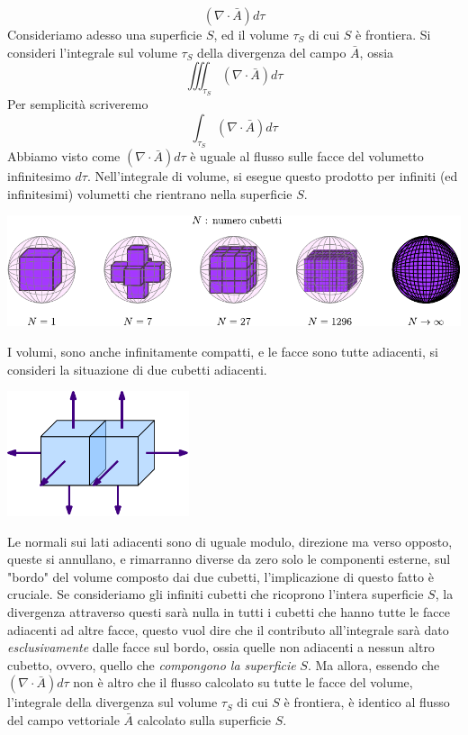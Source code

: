 \documentclass[10pt, letterpaper]{report}
\begin{document}
$$ (\nabla \cdot \bar A)d\tau$$
Consideriamo adesso una superficie $S$, ed il volume $\tau_S$ di cui $S$ è frontiera. Si consideri l'integrale sul volume $\tau_S$ della divergenza del campo $\bar A$, ossia 
$$ \iiint_{\tau_S}(\nabla \cdot \bar A)d\tau$$
Per semplicità scriveremo 
$$ \int_{\tau_S}(\nabla \cdot \bar A)d\tau$$
Abbiamo visto come $(\nabla \cdot \bar A)d\tau$ è uguale al flusso sulle facce del volumetto infinitesimo $d\tau$. Nell'integrale di volume, si esegue questo prodotto per infiniti (ed infinitesimi) volumetti che rientrano nella superficie $S$.
\begin{center}
    \includegraphics[width=\textwidth]{images/teoDiv.pdf}
\end{center}
I volumi, sono anche infinitamente compatti, e le facce sono tutte adiacenti, si consideri la situazione di due cubetti adiacenti.
\begin{center}
    \includegraphics[width=0.4\textwidth]{images/IntDiv2.pdf}
\end{center}
Le normali sui lati adiacenti sono di uguale modulo, direzione ma verso opposto, queste si annullano, e rimarranno diverse da zero solo le componenti esterne, sul "bordo" del volume composto dai due cubetti, l'implicazione di questo fatto è cruciale. \acc Se consideriamo gli infiniti cubetti che ricoprono l'intera superficie $S$, la divergenza attraverso questi sarà nulla in tutti i cubetti che hanno tutte le facce adiacenti ad altre facce, questo vuol dire che il contributo all'integrale sarà dato \textit{esclusivamente} dalle facce sul bordo, ossia quelle non adiacenti a nessun altro cubetto, ovvero, quello che \textit{compongono la superficie} $S$.\acc 
Ma allora, essendo che $(\nabla \cdot \bar A)d\tau$ non è altro che il flusso calcolato su tutte le facce del volume, l'integrale della divergenza sul volume $\tau_S$ di cui $S$ è frontiera, è identico al flusso del campo vettoriale $\bar A$ calcolato sulla superficie $S$. \acc 
\end{document}
